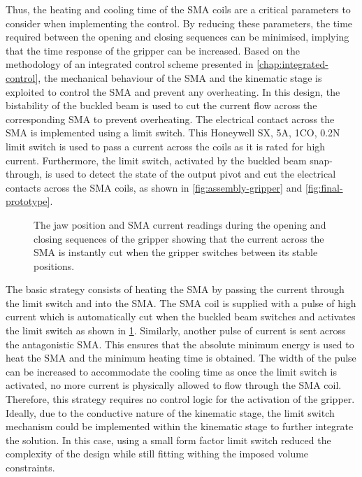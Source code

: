Thus, the heating and cooling time of the SMA coils are a critical parameters to consider when implementing the control. By reducing these parameters, the time required between the opening and closing sequences can be minimised, implying that the time response of the gripper can be increased. Based on the methodology of an integrated control scheme presented in \cref{chap:integrated-control}, the mechanical behaviour of the SMA and the kinematic stage is exploited to control the SMA and prevent any overheating. In this design, the bistability of the buckled beam is used to cut the current flow across the corresponding SMA to prevent overheating. The electrical contact across the SMA is implemented using a limit switch. This Honeywell SX, 5A, 1CO, 0.2N limit switch is used to pass a current across the coils as it is rated for high current. Furthermore, the limit switch, activated by the buckled beam snap-through, is used to detect the state of the output pivot and cut the electrical contacts across the SMA coils, as shown in \cref{fig:assembly-gripper} and \cref{fig:final-prototype}.
\begin{figure}[h!] %
    \centering
  \caption{The jaw position and SMA current readings during the opening and closing sequences of the gripper showing that the current across the SMA is instantly cut when the gripper switches between its stable positions.}
  \label{fig:smabb-actuation}
\end{figure}

The basic strategy consists of heating the SMA by passing the current through the limit switch and into the SMA. The SMA coil is supplied with a pulse of high current which is automatically cut when the buckled beam switches and activates the limit switch as shown in \cref{fig:smabb-actuation}. Similarly, another pulse of current is sent across the antagonistic SMA. This ensures that the absolute minimum energy is used to heat the SMA and the minimum heating time is obtained. The width of the pulse can be increased to accommodate the cooling time as once the limit switch is activated, no more current is physically allowed to flow through the SMA coil. Therefore, this strategy requires no control logic for the activation of the gripper. Ideally, due to the conductive nature of the kinematic stage, the limit switch mechanism could be implemented within the kinematic stage to further integrate the solution. In this case, using a small form factor limit switch reduced the complexity of the design while still fitting withing the imposed volume constraints.

